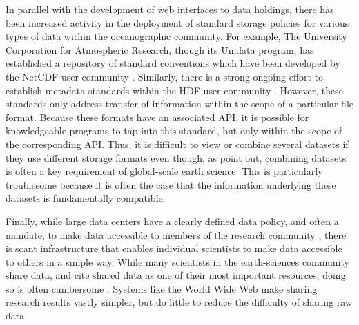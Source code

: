 \documentclass[12pt]{article}
\begin{document}
In parallel with the development of web interfaces to data holdings, there
has been increased activity in the deployment of standard storage policies
for various types of data within the oceanographic community. For example,
The University Corporation for Atmospheric Research, though its Unidata
program, has established a repository of standard conventions which have been
developed by the \acs{NetCDF} user community \cite{netcdf:conventions}.
Similarly, there is a strong ongoing effort to establish metadata standards
within the \acs{HDF} user community \cite{hdfeos}. However, these standards
only address transfer of information within the scope of a particular file
format.
Because these formats have an associated \ac{API}, it is possible for
knowledgeable programs to tap into this standard, but only within the scope
of the corresponding \ac{API}. Thus, it is difficult to view or combine several
datasets if they use different storage formats even though, as
 point out, combining datasets is often a key
requirement of global-scale earth science.  This is particularly troublesome
because it is often the case that the information underlying these datasets
is fundamentally compatible.

Finally, while large data centers have a clearly defined data policy, and
often a mandate, to make data accessible to members of the research community
\cite{noaa:policy}, there is scant infrastructure that enables individual
scientists to make data accessible to others in a simple way. While many
scientists in the earth-sciences community share data, and cite shared data
as one of their most important resources, doing so is often cumbersome
\cite{dods:workshop1}. Systems like the World Wide Web make sharing research
results vastly simpler, but do little to reduce the difficulty of sharing raw
data.
\end{document}
